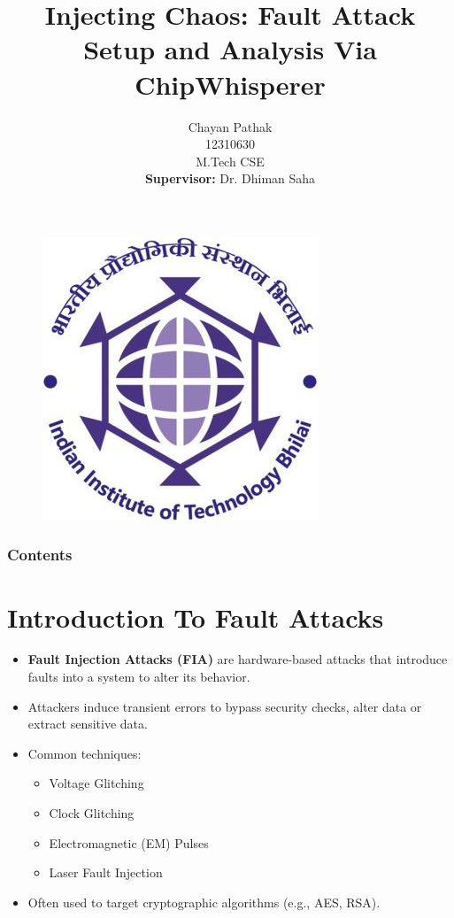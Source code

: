 \documentclass{beamer}
\author[Chayan Pathak,M.Tech,CSE]{Chayan Pathak\\12310630\\M.Tech CSE \\ \textbf{Supervisor:} Dr. Dhiman Saha}
\title[Thesis Defence Seminar]{Injecting Chaos: Fault Attack Setup and Analysis Via ChipWhisperer}
\date[10/06/2025]
\newenvironment{tres important}[2][]{
	\setkeys{EmphEqEnv}{#2}
	\setkeys{EmphEqOpt}{box={\setlength{\fboxsep}{10pt}\fcolorbox{myNewColorA}{white}},#1}
	\EmphEqMainEnv}
{\endEmphEqMainEnv}
\begin{document}

\begin{frame}
        \begin{figure}
	\centering
	\includegraphics[width=0.2\linewidth]{images/iitbhilailogo.png}
	\label{fig:iitlogo}
        \end{figure}
    
            \titlepage
            
        \end{frame}
              
        \begin{frame}
            \frametitle{Contents}
            \tableofcontents
        \end{frame}


\section{Introduction To Fault Attacks}
\begin{frame}

  \begin{itemize}
    \item \textbf{Fault Injection Attacks (FIA)} are hardware-based attacks that introduce faults into a system to alter its behavior.
    \item Attackers induce transient errors to bypass security checks, alter data or extract sensitive data.
    \item Common techniques:
    \begin{itemize}
        \item Voltage Glitching
        \item Clock Glitching
        \item Electromagnetic (EM) Pulses
        \item Laser Fault Injection
    \end{itemize}
    \item Often used to target cryptographic algorithms (e.g., AES, RSA).
  \end{itemize}
\end{frame}
\end{document}
